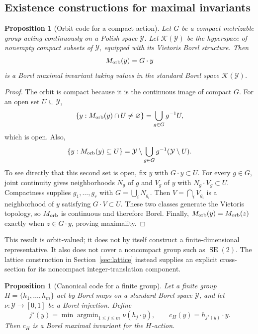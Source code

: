 \documentclass[11pt]{article}
\theoremstyle{plain}
\newtheorem{proposition}[theorem]{Proposition}
\theoremstyle{definition}
\numberwithin{equation}{section}
\DeclareMathOperator{\argmin}{argmin}
\newcommand{\1}{\mathbf 1}
\newcommand{\calK}{\mathcal K}
\newcommand{\calY}{\mathcal Y}
\begin{document}
\subsection{Existence constructions for maximal invariants}

\begin{proposition}[Orbit code for a compact action]
\label{prop:compact-orbit-code}
Let $G$ be a compact metrizable group acting continuously on a Polish space
$\calY$. Let $\calK(\calY)$ be the hyperspace of nonempty compact subsets of
$\calY$, equipped with its Vietoris Borel structure. Then
\[
M_{\rm orb}(y)=G\cdot y
\]
is a Borel maximal invariant taking values in the standard Borel space
$\calK(\calY)$.
\end{proposition}

\begin{proof}
The orbit is compact because it is the continuous image of compact $G$. For
an open set $U\subseteq\calY$,
\[
\{y:M_{\rm orb}(y)\cap U\ne\varnothing\}
=\bigcup_{g\in G}g^{-1}U,
\]
which is open. Also,
\[
\{y:M_{\rm orb}(y)\subseteq U\}
=\calY\setminus\bigcup_{g\in G}g^{-1}(\calY\setminus U).
\]
To see directly that this second set is open, fix $y$ with $G\cdot y\subset U$.
For every $g\in G$, joint continuity gives neighborhoods $N_g$ of $g$ and
$V_g$ of $y$ with $N_g\cdot V_g\subset U$. Compactness supplies
$g_1,\ldots,g_r$ with $G=\bigcup_iN_{g_i}$. Then
$V=\bigcap_iV_{g_i}$ is a neighborhood of $y$ satisfying $G\cdot V\subset U$.
These two classes generate the Vietoris topology, so $M_{\rm orb}$ is
continuous and therefore Borel. Finally,
$M_{\rm orb}(y)=M_{\rm orb}(z)$ exactly when $z\in G\cdot y$, proving
maximality.
\end{proof}

This result is orbit-valued; it does not by itself construct a
finite-dimensional representative. It also does not cover a noncompact group
such as $\operatorname{SE}(2)$. The lattice construction in
Section~\ref{sec:lattice} instead supplies an explicit cross-section for its
noncompact integer-translation component.

\begin{proposition}[Canonical code for a finite group]
\label{prop:finite-canonical}
Let a finite group $H=\{h_1,\ldots,h_m\}$ act by Borel maps on a standard
Borel space $\calY$, and let $\nu:\calY\to[0,1]$ be a Borel injection. Define
\[
j^\star(y)=\min\argmin_{1\le j\le m}\nu(h_j\cdot y),
\qquad c_H(y)=h_{j^\star(y)}\cdot y.
\]
Then $c_H$ is a Borel maximal invariant for the $H$-action.
\end{proposition}
\end{document}
